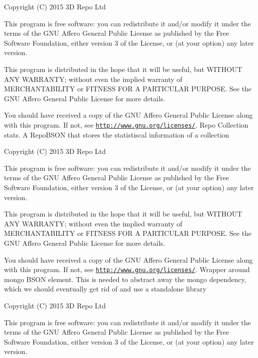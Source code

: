 Copyright (C) 2015 3\+D Repo Ltd

This program is free software\+: you can redistribute it and/or modify it under the terms of the G\+N\+U Affero General Public License as published by the Free Software Foundation, either version 3 of the License, or (at your option) any later version.

This program is distributed in the hope that it will be useful, but W\+I\+T\+H\+O\+U\+T A\+N\+Y W\+A\+R\+R\+A\+N\+T\+Y; without even the implied warranty of M\+E\+R\+C\+H\+A\+N\+T\+A\+B\+I\+L\+I\+T\+Y or F\+I\+T\+N\+E\+S\+S F\+O\+R A P\+A\+R\+T\+I\+C\+U\+L\+A\+R P\+U\+R\+P\+O\+S\+E. See the G\+N\+U Affero General Public License for more details.

You should have received a copy of the G\+N\+U Affero General Public License along with this program. If not, see \href{http://www.gnu.org/licenses/}{\tt http\+://www.\+gnu.\+org/licenses/}. Repo Collection stats. A Repo\+B\+S\+O\+N that stores the statistiscal information of a collection

Copyright (C) 2015 3\+D Repo Ltd

This program is free software\+: you can redistribute it and/or modify it under the terms of the G\+N\+U Affero General Public License as published by the Free Software Foundation, either version 3 of the License, or (at your option) any later version.

This program is distributed in the hope that it will be useful, but W\+I\+T\+H\+O\+U\+T A\+N\+Y W\+A\+R\+R\+A\+N\+T\+Y; without even the implied warranty of M\+E\+R\+C\+H\+A\+N\+T\+A\+B\+I\+L\+I\+T\+Y or F\+I\+T\+N\+E\+S\+S F\+O\+R A P\+A\+R\+T\+I\+C\+U\+L\+A\+R P\+U\+R\+P\+O\+S\+E. See the G\+N\+U Affero General Public License for more details.

You should have received a copy of the G\+N\+U Affero General Public License along with this program. If not, see \href{http://www.gnu.org/licenses/}{\tt http\+://www.\+gnu.\+org/licenses/}. Wrapper around mongo B\+S\+O\+N element. This is needed to abstract away the mongo dependency, which we should eventually get rid of and use a standalone library

Copyright (C) 2015 3\+D Repo Ltd

This program is free software\+: you can redistribute it and/or modify it under the terms of the G\+N\+U Affero General Public License as published by the Free Software Foundation, either version 3 of the License, or (at your option) any later version.

